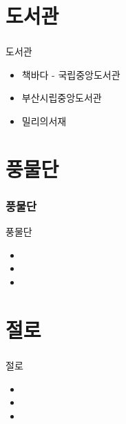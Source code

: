 \documentclass[aspectratio=1610,20pt,xcolor=pdftex,dvipsnames,table,handout]{beamer}
\begin{document}
		\section{도서관}
		\begin{frame} [t,plain]
		\frametitle{}
			\begin{block} {도서관}
			\setlength{\leftmargini}{1em}			
			\begin{itemize}
				\item 책바다 - 국립중앙도서관
				\item 부산시립중앙도서관
				\item 밀리의서재 
			\end{itemize}
			\end{block}						
		\end{frame}					



		\section{풍물단}
		\begin{frame} [t,plain]
		\frametitle{풍물단}
			\begin{block} {풍물단}
			\setlength{\leftmargini}{1em}			
			\begin{itemize}
				\item 	\hrulefill
				\item 	\hrulefill
				\item 	\hrulefill
			\end{itemize}
			\end{block}						
		\end{frame}					


		\section{절로}
		\begin{frame} [t,plain]
		\frametitle{}
			\begin{block} {절로}
			\setlength{\leftmargini}{1em}			
			\begin{itemize}
				\item 	\hrulefill
				\item 	\hrulefill
				\item 	\hrulefill
			\end{itemize}
			\end{block}						
		\end{frame}					
\end{document}
